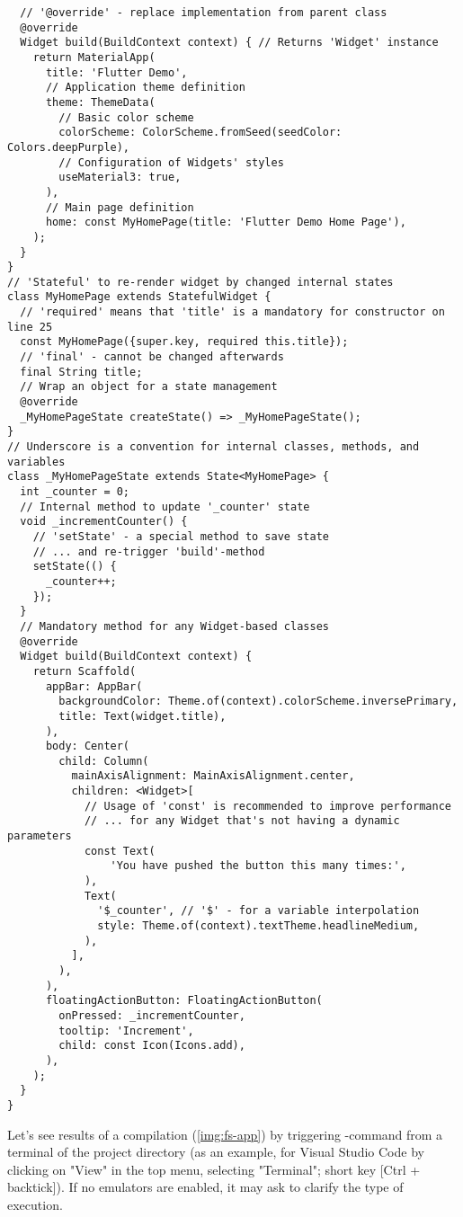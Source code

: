 \begin{lstlisting}
  // '@override' - replace implementation from parent class
  @override
  Widget build(BuildContext context) { // Returns 'Widget' instance
    return MaterialApp(
      title: 'Flutter Demo',
      // Application theme definition
      theme: ThemeData(
        // Basic color scheme
        colorScheme: ColorScheme.fromSeed(seedColor: Colors.deepPurple),
        // Configuration of Widgets' styles
        useMaterial3: true,
      ),
      // Main page definition
      home: const MyHomePage(title: 'Flutter Demo Home Page'),
    );
  }
}
// 'Stateful' to re-render widget by changed internal states
class MyHomePage extends StatefulWidget {
  // 'required' means that 'title' is a mandatory for constructor on line 25
  const MyHomePage({super.key, required this.title});
  // 'final' - cannot be changed afterwards
  final String title;
  // Wrap an object for a state management
  @override
  _MyHomePageState createState() => _MyHomePageState();
}
// Underscore is a convention for internal classes, methods, and variables
class _MyHomePageState extends State<MyHomePage> {
  int _counter = 0;
  // Internal method to update '_counter' state
  void _incrementCounter() {
    // 'setState' - a special method to save state
    // ... and re-trigger 'build'-method
    setState(() {
      _counter++;
    });
  }
  // Mandatory method for any Widget-based classes
  @override
  Widget build(BuildContext context) {
    return Scaffold(
      appBar: AppBar(
        backgroundColor: Theme.of(context).colorScheme.inversePrimary,
        title: Text(widget.title),
      ),
      body: Center(
        child: Column(
          mainAxisAlignment: MainAxisAlignment.center,
          children: <Widget>[
            // Usage of 'const' is recommended to improve performance
            // ... for any Widget that's not having a dynamic parameters
            const Text(
                'You have pushed the button this many times:',
            ),
            Text(
              '$_counter', // '$' - for a variable interpolation
              style: Theme.of(context).textTheme.headlineMedium,
            ),
          ],
        ),
      ),
      floatingActionButton: FloatingActionButton(
        onPressed: _incrementCounter,
        tooltip: 'Increment',
        child: const Icon(Icons.add),
      ),
    );
  }
}
\end{lstlisting}

Let's see results of a compilation (\cref{img:fs-app}) by triggering -command from a terminal of the 
project directory (as an example, for Visual Studio Code by clicking on "View" in the top menu, selecting "Terminal"; 
short key [Ctrl + backtick]). If no emulators are enabled, it may ask to clarify the type of execution.

